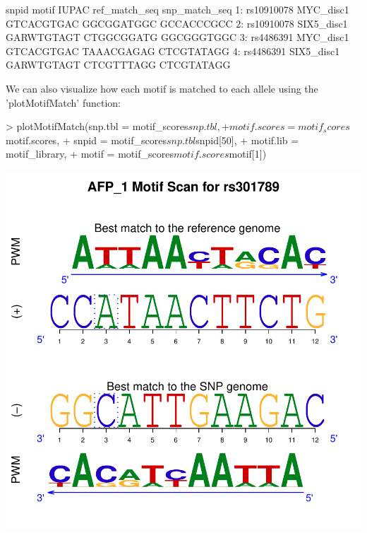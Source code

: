 \documentclass[a4paper,10pt]{article}
\begin{document}
\begin{Schunk}
\begin{Soutput}
        snpid      motif      IUPAC ref_match_seq snp_match_seq
1: rs10910078  MYC_disc1 GTCACGTGAC    GGCGGATGGC    GCCACCCGCC
2: rs10910078 SIX5_disc1 GARWTGTAGT    CTGGCGGATG    GGCGGGTGGC
3:  rs4486391  MYC_disc1 GTCACGTGAC    TAAACGAGAG    CTCGTATAGG
4:  rs4486391 SIX5_disc1 GARWTGTAGT    CTCGTTTAGG    CTCGTATAGG
\end{Soutput}
\end{Schunk}

We can also visualize how each motif is matched to each allele using the 'plotMotifMatch' function:

\begin{Schunk}
\begin{Sinput}
> plotMotifMatch(snp.tbl = motif_scores$snp.tbl,
+                motif.scores = motif_scores$motif.scores,
+                snpid = motif_scores$snp.tbl$snpid[50],
+                motif.lib = motif_library,
+                motif = motif_scores$motif.scores$motif[1])
\end{Sinput}
\end{Schunk}
\includegraphics{atsnp-010}
\end{document}
